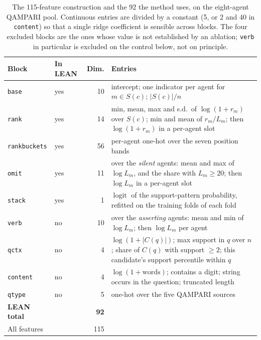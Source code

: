\documentclass{article}
\begin{document}
\begin{table}
  \caption{The 115-feature construction and the 92 the method uses, on the eight-agent QAMPARI pool. Continuous entries are divided by a constant (5, or 2 and 40 in \texttt{content}) so that a single ridge coefficient is sensible across blocks. The four excluded blocks are the ones whose value is not established by an ablation; \texttt{verb} in particular is excluded on the control below, not on principle.}
  \label{tab:blocks}
  \centering
  \begin{tabular}{llrp{6.1cm}}
    \toprule
    Block & In LEAN & Dim. & Entries \\
    \midrule
    \texttt{base}        & yes & 10 & intercept; one indicator per agent for $m \in S(c)$; $|S(c)|/n$ \\
    \texttt{rank}        & yes & 14 & min, mean, max and s.d.\ of $\log(1+r_m)$ over $S(c)$; min and mean of $r_m/L_m$; then $\log(1+r_m)$ in a per-agent slot \\
    \texttt{rankbuckets} & yes & 56 & per-agent one-hot over the seven position bands \\
    \texttt{omit}        & yes & 11 & over the \emph{silent} agents: mean and max of $\log L_m$, and the share with $L_m \geq 20$; then $\log L_m$ in a per-agent slot \\
    \texttt{stack}       & yes &  1 & $\operatorname{logit}$ of the support-pattern probability, refitted on the training folds of each fold \\
    \midrule
    \texttt{verb}        & no  & 10 & over the \emph{asserting} agents: mean and min of $\log L_m$; then $\log L_m$ per agent \\
    \texttt{qctx}        & no  &  4 & $\log(1+|C(q)|)$; max support in $q$ over $n$; share of $C(q)$ with support $\geq 2$; this candidate's support percentile within $q$ \\
    \texttt{content}     & no  &  4 & $\log(1+\text{words})$; contains a digit; string occurs in the question; truncated length \\
    \texttt{qtype}       & no  &  5 & one-hot over the five QAMPARI sources \\
    \midrule
    \textbf{LEAN total}  &     & \textbf{92} & \\
    All features         &     & 115 & \\
    \bottomrule
  \end{tabular}
\end{table}
\end{document}
